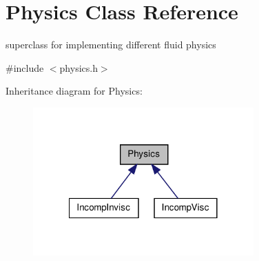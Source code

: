 \hypertarget{classPhysics}{\section{\-Physics \-Class \-Reference}
\label{classPhysics}
}


superclass for implementing different fluid physics  




{\ttfamily \#include $<$physics.\-h$>$}



\-Inheritance diagram for \-Physics\-:
\nopagebreak
\begin{figure}[H]
\begin{center}
\leavevmode
\includegraphics[width=240pt]{classPhysics__inherit__graph}
\end{center}
\end{figure}
